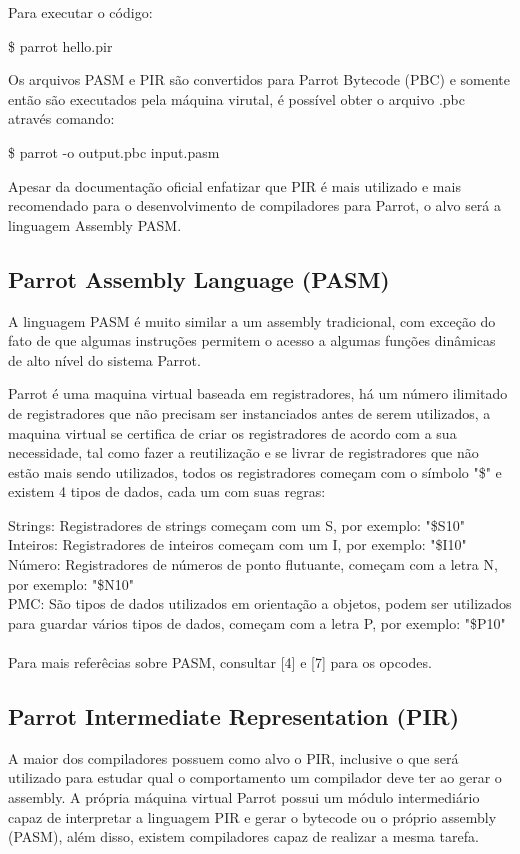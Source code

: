 \documentclass[12pt,a4paper,twoside]{report}
\begin{document}

Para executar o código:
\begin{terminal}
\$ parrot hello.pir
\end{terminal}

Os arquivos PASM e PIR são convertidos para Parrot Bytecode (PBC) e somente então são executados pela máquina virutal, é possível obter o arquivo .pbc através comando:
\begin{terminal}
\$ parrot -o output.pbc input.pasm
\end{terminal}

Apesar da documentação oficial enfatizar que PIR é mais utilizado e mais recomendado para o desenvolvimento de compiladores para Parrot, o alvo será a linguagem Assembly PASM.

\subsection{Parrot Assembly Language (PASM)}
A linguagem PASM é muito similar a um assembly tradicional, com exceção do fato de que algumas instruções permitem o acesso a algumas funções dinâmicas de alto nível do sistema Parrot.

Parrot é uma maquina virtual baseada em registradores, há um número ilimitado de registradores que não precisam ser instanciados antes de serem utilizados, a maquina virtual se certifica de criar os registradores de acordo com a sua necessidade,
tal como fazer a reutilização e se livrar de registradores que não estão mais sendo utilizados, todos os registradores começam com o símbolo "\$" e existem 4 tipos de dados, cada um com suas regras:


Strings: Registradores de strings começam com um S, por exemplo: "\$S10" \\
Inteiros: Registradores de inteiros começam com um I, por exemplo: "\$I10" \\
Número: Registradores de números de ponto flutuante, começam com a letra N, por exemplo: "\$N10" \\
PMC: São tipos de dados utilizados em orientação a objetos, podem ser utilizados para guardar vários tipos de dados, começam com a letra P, por exemplo: "\$P10" \\
\\
Para mais referêcias sobre PASM, consultar [4] e [7] para os opcodes.

\subsection{Parrot Intermediate Representation (PIR)}
A maior dos compiladores possuem como alvo o PIR, inclusive o que será
utilizado para estudar qual o comportamento um compilador deve ter ao
gerar o assembly.
A própria máquina virtual Parrot possui um módulo intermediário capaz
de interpretar a linguagem PIR e gerar o bytecode ou o próprio
assembly (PASM), além disso, existem compiladores capaz de realizar a
mesma tarefa.
\end{document}
